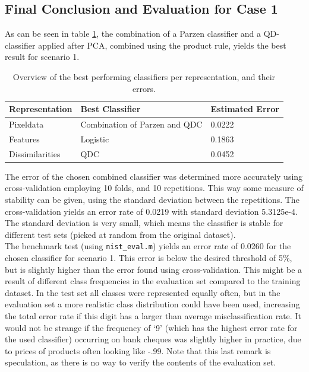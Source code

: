 \subsection{Final Conclusion and Evaluation for Case 1}
As can be seen in table \ref{tab:concase1}, the combination of a Parzen classifier and a QD-classifier applied after PCA, combined using the product rule, yields the best result for scenario 1. 
\begin{table}[H]
	\centering
	\caption{Overview of the best performing classifiers per representation, and their errors.}
	\label{tab:concase1}
	\begin{tabular}{l|ll}
		Representation  & Best Classifier               & Estimated Error \\ \hline
		Pixeldata       & Combination of Parzen and QDC & 0.0222          \\
		Features        & Logistic                      & 0.1863          \\
		Dissimilarities & QDC                           & 0.0452         
	\end{tabular}
\end{table}
\noindent The error of the chosen combined classifier was determined more accurately using cross-validation employing 10 folds, and 10 repetitions. This way some measure of stability can be given, using the standard deviation between the repetitions. The cross-validation yields an error rate of 0.0219 with standard deviation 5.3125e-4. The standard deviation is very small, which means the classifier is stable for different test sets (picked at random from the original dataset).\\
The benchmark test (using \texttt{nist\_eval.m}) yields an error rate of 0.0260 for the chosen classifier for scenario 1. This error is below the desired threshold of 5\%, but is slightly higher than the error found using cross-validation. This might be a result of different class frequencies in the evaluation set compared to the training dataset. In the test set all classes were represented equally often, but in the evaluation set a more realistic class distribution could have been used, increasing the total error rate if this digit has a larger than average misclassification rate. It would not be strange if the frequency of ‘9’ (which has the highest error rate for the used classifier) occurring on bank cheques was slightly higher in practice, due to prices of products often looking like -.99. Note that this last remark is speculation, as there is no way to verify the contents of the evaluation set.





